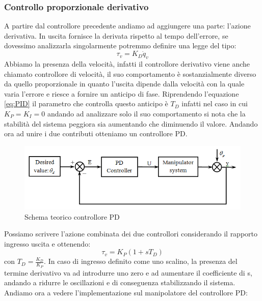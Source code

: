 \subsubsection{Controllo proporzionale derivativo}
A partire dal controllore precedente andiamo ad aggiungere una parte: l'azione derivativa. In uscita fornisce la derivata rispetto al tempo dell'errore, se dovessimo analizzarla singolarmente potremmo definire una legge del tipo:
\begin{equation}
\tau_v = K_D\dot{q}_v
\end{equation}
Abbiamo la presenza della velocità, infatti il controllore derivativo viene anche chiamato controllore di velocità, il suo comportamento è sostanzialmente diverso da quello proporzionale in quanto l'uscita dipende dalla velocità con la quale varia l'errore e riesce a fornire un anticipo di fase. Riprendendo l'equazione \ref{eq:PID} il parametro che controlla questo anticipo è $T_D$ infatti nel caso in cui $K_P=K_I=0$ andando ad analizzare solo il suo comportamento si nota che la stabilità del sistema peggiora sia aumentando che diminuendo il valore. Andando ora ad unire i due contributi otteniamo un controllore PD.
\begin{figure}[ht]
	\begin{center}
		\includegraphics[scale=0.35]{Immagini/Controllori/PDSchema}
		\caption{Schema teorico controllore PD }
		\label{fig:PDSchema}
	\end{center}
\end{figure}
Possiamo scrivere l'azione combinata dei due controllori considerando il rapporto ingresso uscita e ottenendo:
\begin{equation}
\tau_v = K_P(1+sT_D)
\end{equation}
con $T_D = \frac{K_D}{K_P}$. In caso di ingresso definito come uno scalino, la presenza del termine derivativo va ad introdurre uno zero e ad aumentare il coefficiente di s, andando a ridurre le oscillazioni e di conseguenza stabilizzando il sistema.\\ Andiamo ora a vedere l'implementazione sul manipolatore del controllore PD:

